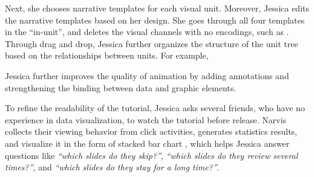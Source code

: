 Next, she chooses narrative templates for each visual unit. 
Moreover, Jessica edits the narrative templates based on her design. 
She goes through all four templates in the ``in-unit'', and deletes the visual channels with no encodings, such as . 
Through drag and drop, Jessica further organizes the structure of the unit tree based on the relationships between units. For example, 

Jessica further improves the quality of animation by adding annotations and strengthening the binding between data and graphic elements. 


To refine the readability of the tutorial, Jessica asks several friends, who have no experience in data visualization, to watch the tutorial before release. Narvis collects their viewing behavior from click activities, generates statistics results, and visualize it in the form of stacked bar chart , which helps Jessica answer questions like \textit{``which slides do they skip?''}, \textit{``which slides do they review several times?''}, and \textit{``which slides do they stay for a long time?''}.




